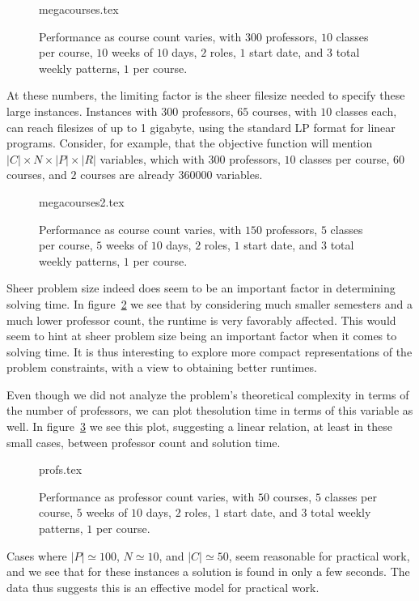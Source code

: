 \begin{figure}
  \begin{center}
    {megacourses.tex}
    \caption{Performance as course count varies, with $300$ professors, $10$ classes per course, $10$ weeks of $10$ days, $2$ roles, $1$ start date, and $3$ total weekly patterns, $1$ per course.}
    \label{bench:megacourses}
  \end{center}
\end{figure}

At these numbers, the limiting factor is the sheer filesize needed to specify these large instances. Instances with $300$ professors, $65$ courses, with $10$ classes each, can reach filesizes of up to 1 gigabyte, using the standard LP format for linear programs. Consider, for example, that the objective function will mention $|C| \times N \times |P| \times |R|$ variables, which with $300$ professors, $10$ classes per course, $60$ courses, and $2$ courses are already $360000$ variables.

\begin{figure}
  \begin{center}
    {megacourses2.tex}
    \caption{Performance as course count varies, with $150$ professors, $5$ classes per course, $5$ weeks of $10$ days, $2$ roles, $1$ start date, and $3$ total weekly patterns, $1$ per course.}
    \label{bench:megacourses2}
  \end{center}
\end{figure}

Sheer problem size indeed does seem to be an important factor in determining solving time. In figure~\ref{bench:megacourses2} we see that by considering much smaller semesters and a much lower professor count, the runtime is very favorably affected. This would seem to hint at sheer problem size being an important factor when it comes to solving time. It is thus interesting to explore more compact representations of the problem constraints, with a view to obtaining better runtimes.

Even though we did not analyze the problem's theoretical complexity in terms of the number of professors, we can plot thesolution time in terms of this variable as well. In figure~\ref{bench:profs} we see this plot, suggesting a linear relation, at least in these small cases, between professor count and solution time.

\begin{figure}
  \begin{center}
    {profs.tex}
    \caption{Performance as professor count varies, with $50$ courses, $5$ classes per course, $5$ weeks of $10$ days, $2$ roles, $1$ start date, and $3$ total weekly patterns, $1$ per course.}
    \label{bench:profs}
  \end{center}
\end{figure}

Cases where $|P| \simeq 100$, $N \simeq 10$, and $|C| \simeq 50$, seem reasonable for practical work, and we see that for these instances a solution is found in only a few seconds. The data thus suggests this is an effective model for practical work.


